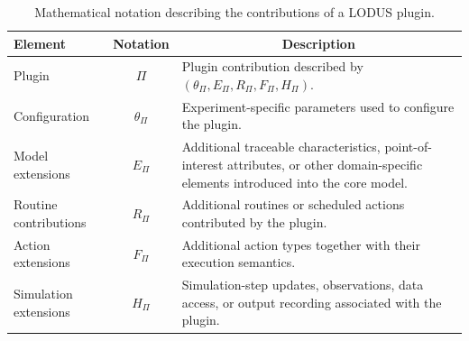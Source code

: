 \begin{table}[ht]
\footnotesize
\centering
\caption{Mathematical notation describing the contributions of a LODUS plugin.}
\label{tbl:notation_plugins}
\begin{tabularx}{\linewidth}{@{}lcX@{}}
\toprule
\textbf{Element} & \textbf{Notation} & \multicolumn{1}{c}{\textbf{Description}} \\ 
\midrule

Plugin &
$\Pi$ &
Plugin contribution described by $(\theta_{\Pi},E_{\Pi},R_{\Pi},F_{\Pi},H_{\Pi})$. \\ 
\midrule

Configuration &
$\theta_{\Pi}$ &
Experiment-specific parameters used to configure the plugin. \\ 
\midrule

Model extensions &
$E_{\Pi}$ &
Additional traceable characteristics, point-of-interest attributes, or other domain-specific elements introduced into the core model. \\ 
\midrule

Routine contributions &
$R_{\Pi}$ &
Additional routines or scheduled actions contributed by the plugin. \\ 
\midrule

Action extensions &
$F_{\Pi}$ &
Additional action types together with their execution semantics. \\ 
\midrule

Simulation extensions &
$H_{\Pi}$ &
Simulation-step updates, observations, data access, or output recording associated with the plugin. \\

\bottomrule
\end{tabularx}
\end{table}

